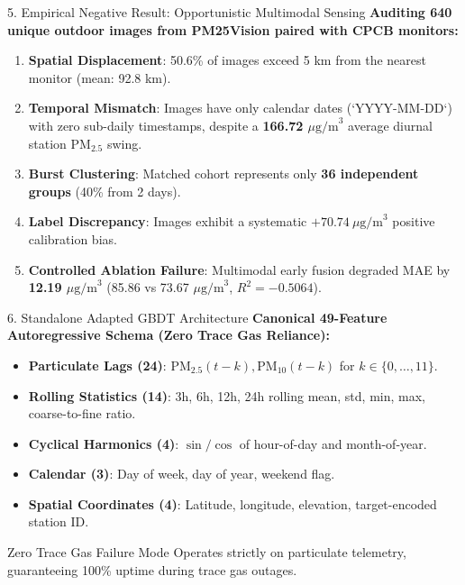 \documentclass[aspectratio=169]{beamer}
\begin{document}
\begin{frame}{5. Empirical Negative Result: Opportunistic Multimodal Sensing}
  \textbf{Auditing 640 unique outdoor images from PM25Vision paired with CPCB monitors:}
  \begin{enumerate}
    \item \textbf{Spatial Displacement}: 50.6\% of images exceed 5 km from the nearest monitor (mean: 92.8 km).
    \item \textbf{Temporal Mismatch}: Images have only calendar dates (`YYYY-MM-DD`) with zero sub-daily timestamps, despite a \textbf{166.72 $\mu\text{g/m}^3$} average diurnal station $\text{PM}_{2.5}$ swing.
    \item \textbf{Burst Clustering}: Matched cohort represents only \textbf{36 independent groups} (40\% from 2 days).
    \item \textbf{Label Discrepancy}: Images exhibit a systematic \textbf{$+70.74\ \mu\text{g/m}^3$} positive calibration bias.
    \item \textbf{Controlled Ablation Failure}: Multimodal early fusion degraded MAE by \textbf{12.19 $\mu\text{g/m}^3$} (85.86 vs 73.67 $\mu\text{g/m}^3$, $R^2 = -0.5064$).
  \end{enumerate}
\end{frame}

\begin{frame}{6. Standalone Adapted GBDT Architecture}
  \textbf{Canonical 49-Feature Autoregressive Schema (Zero Trace Gas Reliance):}
  \begin{itemize}
    \item \textbf{Particulate Lags (24)}: $\text{PM}_{2.5}(t-k), \text{PM}_{10}(t-k)$ for $k \in \{0, \dots, 11\}$.
    \item \textbf{Rolling Statistics (14)}: 3h, 6h, 12h, 24h rolling mean, std, min, max, coarse-to-fine ratio.
    \item \textbf{Cyclical Harmonics (4)}: $\sin/\cos$ of hour-of-day and month-of-year.
    \item \textbf{Calendar (3)}: Day of week, day of year, weekend flag.
    \item \textbf{Spatial Coordinates (4)}: Latitude, longitude, elevation, target-encoded station ID.
  \end{itemize}
  \begin{alertblock}{Zero Trace Gas Failure Mode}
    Operates strictly on particulate telemetry, guaranteeing 100\% uptime during trace gas outages.
  \end{alertblock}
\end{frame}
\end{document}
